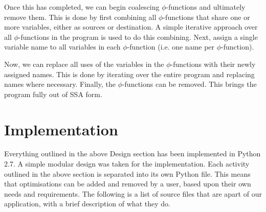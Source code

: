 \documentclass[a4paper,10pt]{report}
\begin{document}
Once this has completed, we can begin coalescing \(\phi\)-functions and ultimately remove them. This is done by first combining
all \(\phi\)-functions that share one or more variables, either as sources or destination. A simple iterative approach over all 
\(\phi\)-functions in the program is used to do this combining. Next, assign a single variable name to all variables in each 
\(\phi\)-function (i.e. one name per \(\phi\)-function). 

Now, we can replace all uses of the variables in the \(\phi\)-functions with their newly assigned names. This is done by iterating
over the entire program and replacing names where necessary. Finally, the \(\phi\)-functions can be removed. This brings the program
fully out of SSA form.

\chapter{Implementation}
Everything outlined in the above Design section has been implemented in Python 2.7. A simple modular design was taken for the
implementation. Each activity outlined in the above section is separated into its own Python file. This means that optimisations
can be added and removed by a user, based upon their own needs and requirements. The following is a list of source files that
are apart of our application, with a brief description of what they do.
\end{document}
